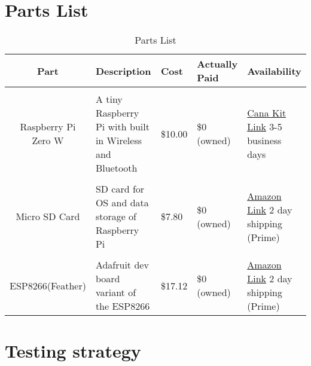 \documentclass[12pt]{article}
\begin{document}
\section{Parts List}
\begin{table}[H]
    \centering
    \caption{Parts List}
    \label{tab:specs4}
    \begin{tabularx}{\linewidth}{cXXXX} \toprule
        Part & Description & Cost & Actually Paid & Availability\\ \midrule
        \\Raspberry Pi Zero W & A tiny Raspberry Pi with built in Wireless and Bluetooth& \$10.00 & \$0 (owned) & \href{https://www.canakit.com/raspberry-pi-zero-wireless.html?src=raspberrypi}{Cana Kit Link} 3-5 business days\\
        \\Micro SD Card & SD card for OS and data storage of Raspberry Pi& \$7.80 & \$0 (owned) & \href{https://www.amazon.com/SanDisk-Mobile-MicroSDHC-Memory-SDSDQM-B35A/dp/B004ZIENBA/ref=sr\_1\_5?ie=UTF8\&qid=1510058599\&sr=8-5\&keywords=micro+sd+card+8gb\&dpID=41hGPOLym4L\&preST=\_SX300\_QL70\_\&dpSrc=srch}{Amazon Link} 2 day shipping (Prime)\\
        \\ESP8266(Feather) & Adafruit dev board variant of the ESP8266 & \$17.12 & \$0 (owned) & \href{https://www.amazon.com/Adafruit-2821-Feather-HUZZAH-ESP8266/dp/B019MGW6N6/ref=sr\_1\_1\_sspa?ie=UTF8\&qid=1510058499\&sr=8-1-spons\&keywords=adafruit+feather\&psc=1}{Amazon Link} 2 day shipping (Prime)\\ 
    \end{tabularx}
\end{table}
\section{Testing strategy}
\end{document}
